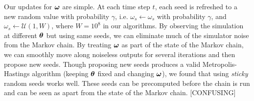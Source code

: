 \documentclass[]{article}
\begin{document}
Our updates for ${\bm \omega}$ are simple.  At each time step $t$, each seed is refreshed to a new random value with probability $\gamma$, i.e. $\omega_s \leftarrow \omega_s$ with probability $\gamma$, and $\omega_s \leftarrow \mathcal{U}(1,W)$, where $W=10^8$ in our algorithms.  By observing the simulation at different ${\bm \theta}$ but using same seeds, we can eliminate much of the simulator noise from the Markov chain.  By treating ${\bm \omega}$ as part of the state of the Markov chain, we can smoothly move along noiseless outputs for several iterations and then propose new seeds.  Though proposing new seeds produces a valid Metropolis-Hastings algorithm (keeping ${\bm \theta}$ fixed and changing ${\bm \omega}$), we found that using {\em sticky} random seeds works well.  These seeds can be precomputed before the chain is run and can be seen as apart from the state of the Markov chain.  [CONFUSING]

\end{document}
